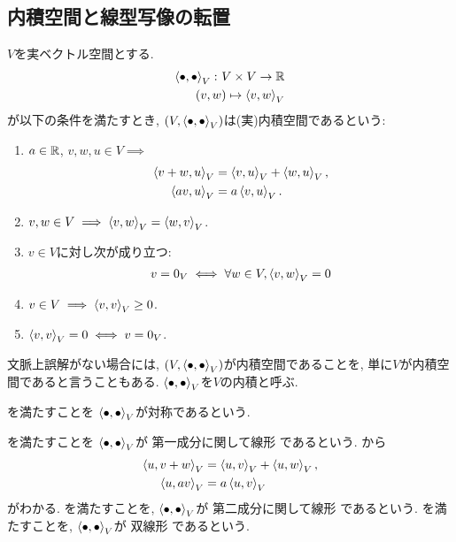 \subsection{内積空間と線型写像の転置}
\begin{definition}
  $V$を実ベクトル空間とする.
  \begin{align*}
    \Braket{\bullet,\bullet}_V
    \colon
    V\times V \to \mathbb{R}\\
    (v,w) \mapsto\Braket{v,w}_V
  \end{align*}
  が以下の条件を満たすとき,
  $(V,\Braket{\bullet,\bullet}_V)$は(実)内積空間であるという:
  \begin{enumerate}
  \item
    \label{def:inner:item:line}
    $a\in\mathbb{R}$, $v,w,u\in V\implies$
    \begin{align}
      \Braket{v+w,u}_V&=\Braket{v,u}_V+\Braket{w,u}_V,
      \label{def:inner:item:line:1:sum}
      \\
      \Braket{av,u}_V&=a\Braket{v,u}_V.
      \label{def:inner:item:line:1:sca}
    \end{align}
  \item
    \label{def:inner:item:sym}
    $v,w\in V \implies \Braket{v,w}_V=\Braket{w,v}_V$.
  \item 
    \label{def:inner:item:nondege}
    $v\in V$に対し次が成り立つ:
    \begin{align}
      v=0_V
      \iff
      \forall w\in V,\Braket{v,w}_V=0
      \label{def:inner:item:nondege:1}
    \end{align}
  \item
    \label{def:inner:item:semi}
    $v\in V \implies \Braket{v,v}_V\geq 0$.
  \item
    \label{def:inner:item:posi}
    $\Braket{v,v}_V=0\iff v=0_V$.
  \end{enumerate}
\end{definition}
\begin{remark}
  文脈上誤解がない場合には,
  $(V,\Braket{\bullet,\bullet}_V)$が内積空間であることを,
  単に$V$が内積空間であると言うこともある.
  $\Braket{\bullet,\bullet}_V$を$V$の内積と呼ぶ.
\end{remark}
\begin{remark}
  を満たすことを
  $\Braket{\bullet,\bullet}_V$が対称であるという.
\end{remark}
\begin{remark}
  を満たすことを
  $\Braket{\bullet,\bullet}_V$が
  第一成分に関して線形
  であるという.
  から
  \begin{align}
    \Braket{u,v+w}_V&=\Braket{u,v}_V+\Braket{u,w}_V,
    \label{def:inner:item:line:2:sum}
    \\
    \Braket{u,av}_V&=a\Braket{u,v}_V    
    \label{def:inner:item:line:2:sca}
  \end{align}
  がわかる.
  を満たすことを,
  $\Braket{\bullet,\bullet}_V$が
  第二成分に関して線形
  であるという.
  を満たすことを,
  $\Braket{\bullet,\bullet}_V$が
  双線形
  であるという.
\end{remark}

